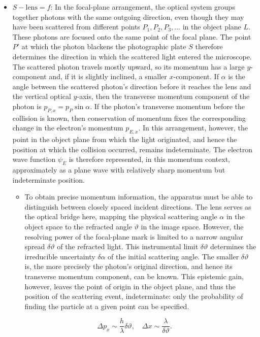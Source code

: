 \documentclass[final,12pt]{article}
\newcommand{\pos}{\ensuremath{x}\xspace}
\newcommand{\mom}{\ensuremath{p_x}\xspace}
\begin{document}
\begin{itemize}
\item $S-\text{lens}=f$: In the focal-plane arrangement, the optical system groups together photons with the same outgoing direction, even though they may have been scattered from different points $P_1,P_2,P_3,\ldots$ in the object plane $L$. These photons are focused onto the same point of the focal plane. The point $P'$ at which the photon blackens the photographic plate $S$ therefore determines the direction in which the scattered light entered the microscope. The scattered photon travels mostly upward, so its momentum has a large $y$-component and, if it is slightly inclined, a smaller $x$-component. If $\alpha$ is the angle between the scattered photon's direction before it reaches the lens and the vertical optical $y$-axis, then the transverse momentum component of the photon is $p_{P,x}=p_P\sin\alpha$. If the photon's transverse momentum before the collision is known, then conservation of momentum fixes the corresponding change in the electron's momentum $p_{E,x}$. In this arrangement, however, the point in the object plane from which the light originated, and hence the position at which the collision occurred, remains indeterminate. The electron wave function $\psi_E$ is therefore represented, in this momentum context, approximately as a plane wave with relatively sharp momentum but indeterminate position.

\begin{itemize}
\item To obtain precise momentum information, the apparatus must be able to distinguish between closely spaced incident directions. The lens serves as the optical bridge here, mapping the physical scattering angle $\alpha$ in the object space to the refracted angle $\vartheta$ in the image space. However, the resolving power of the focal-plane mark is limited to a narrow angular spread $\delta\vartheta$ of the refracted light. This instrumental limit $\delta\vartheta$ determines the irreducible uncertainty $\delta\alpha$ of the initial scattering angle. The smaller $\delta\vartheta$ is, the more precisely the photon's original direction, and hence its transverse momentum component, can be known. This epistemic gain, however, leaves the point of origin in the object plane, and thus the position of the scattering event, indeterminate: only the probability of finding the particle at a given point can be specified.
\end{itemize}

\begin{equation*}
\Delta \mom \sim \frac{h}{\lambda}\delta\vartheta, \quad \Delta \pos \sim \frac{\lambda}{\delta\vartheta}.
\end{equation*}
\end{itemize}
\end{document}
